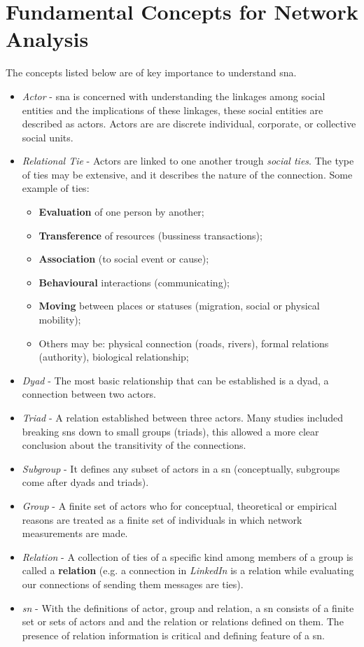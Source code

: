 \section{Fundamental Concepts for Network Analysis}

The concepts listed below are of key importance to understand \gls{sna}.\cite{wasserman1994social}

\begin{itemize}
    \item \emph{Actor} - \gls{sna} is concerned with understanding the linkages among social entities and the implications of these linkages, these social entities are described as actors. Actors are are discrete individual, corporate, or collective social units.
    \item \emph{Relational Tie} - Actors are linked to one another trough \textit{social ties}. The type of ties may be extensive, and it describes the nature of the connection. Some example of ties:
        \begin{itemize}
            \item \textbf{Evaluation} of one person by another;
            \item \textbf{Transference} of resources (bussiness transactions);
            \item \textbf{Association} (to social event or cause);
            \item \textbf{Behavioural} interactions (communicating);
            \item \textbf{Moving} between places or statuses (migration, social or physical mobility);
            \item Others may be: physical connection (roads, rivers), formal relations (authority), biological relationship;
        \end{itemize}
    \item \emph{Dyad} - The most basic relationship that can be established is a dyad, a connection between two actors.
    \item \emph{Triad} - A relation established between three actors. Many studies included breaking \glspl{sn} down to small groups (triads), this allowed a more clear conclusion about the transitivity of the connections.
    \item \emph{Subgroup} - It defines any subset of actors in a \gls{sn} (conceptually, subgroups come after dyads and triads).
    \item \emph{Group} - A finite set of actors who for conceptual, theoretical or empirical reasons are treated as a finite set of individuals in which network measurements are made.
    \item \emph{Relation} - A collection of ties of a specific kind among members of a group is called a \textbf{relation} (e.g. a connection in \textit{LinkedIn} is a relation while evaluating our connections of sending them messages are ties).
    \item \emph{\gls{sn}} - With the definitions of actor, group and relation, a \gls{sn} consists of a finite set or sets of actors and
    and the relation or relations defined on them. The presence of relation information is critical and defining feature of a \gls{sn}.
\end{itemize}

